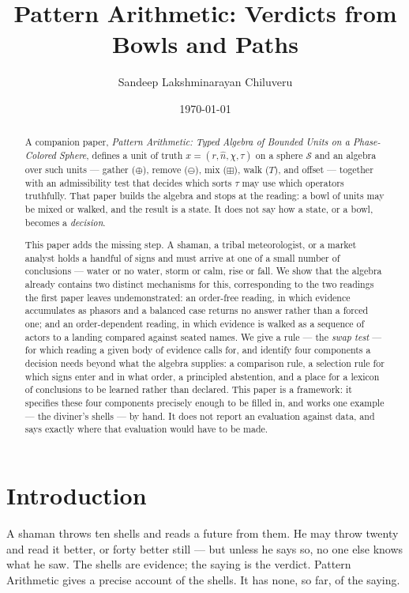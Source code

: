 \documentclass[12pt, a4paper]{article}
\title{Pattern Arithmetic: Verdicts from Bowls and Paths}
\author{Sandeep Lakshminarayan Chiluveru}
\date{\today}
\begin{document}
\maketitle

\begin{abstract}
A companion paper, \emph{Pattern Arithmetic: Typed Algebra of Bounded
Units on a Phase-Colored Sphere}, defines a unit of truth
$x=(r,\hat n,\chi,\tau)$ on a sphere $\mathcal{S}$ and an algebra over
such units --- gather ($\oplus$), remove ($\ominus$), mix ($\boxplus$),
walk ($T$), and offset --- together with an admissibility test that
decides which sorts $\tau$ may use which operators truthfully. That
paper builds the algebra and stops at the reading: a bowl of units may
be mixed or walked, and the result is a state. It does not say how a
state, or a bowl, becomes a \emph{decision}.

This paper adds the missing step. A shaman, a tribal meteorologist, or
a market analyst holds a handful of signs and must arrive at one of a
small number of conclusions --- water or no water, storm or calm, rise
or fall. We show that the algebra already contains two distinct
mechanisms for this, corresponding to the two readings the first paper
leaves undemonstrated: an order-free reading, in which evidence
accumulates as phasors and a balanced case returns no answer rather
than a forced one; and an order-dependent reading, in which evidence
is walked as a sequence of actors to a landing compared against
seated names. We give a rule --- the \emph{swap test} --- for which
reading a given body of evidence calls for, and identify four
components a decision needs beyond what the algebra supplies: a
comparison rule, a selection rule for which signs enter and in what
order, a principled abstention, and a place for a lexicon of
conclusions to be learned rather than declared. This paper is a
framework: it specifies these four components precisely enough to be
filled in, and works one example --- the diviner's shells --- by hand.
It does not report an evaluation against data, and says exactly where
that evaluation would have to be made.
\end{abstract}

\section{Introduction}
\label{sec:intro}

A shaman throws ten shells and reads a future from them. He may throw
twenty and read it better, or forty better still --- but unless he
says so, no one else knows what he saw. The shells are evidence; the
saying is the verdict. Pattern Arithmetic gives a precise account of
the shells. It has none, so far, of the saying.
\end{document}
